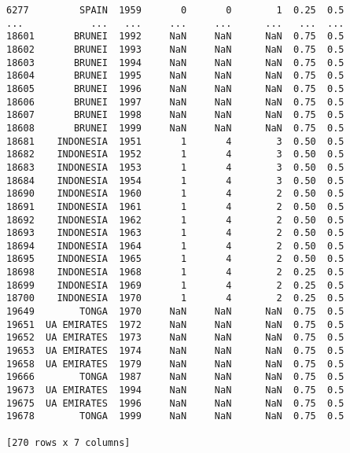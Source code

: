 \documentclass[12pt,fleqn]{article}\usepackage{common}
\begin{document}
\begin{verbatim}
6277         SPAIN  1959       0       0        1  0.25  0.5
...            ...   ...     ...     ...      ...   ...  ...
18601       BRUNEI  1992     NaN     NaN      NaN  0.75  0.5
18602       BRUNEI  1993     NaN     NaN      NaN  0.75  0.5
18603       BRUNEI  1994     NaN     NaN      NaN  0.75  0.5
18604       BRUNEI  1995     NaN     NaN      NaN  0.75  0.5
18605       BRUNEI  1996     NaN     NaN      NaN  0.75  0.5
18606       BRUNEI  1997     NaN     NaN      NaN  0.75  0.5
18607       BRUNEI  1998     NaN     NaN      NaN  0.75  0.5
18608       BRUNEI  1999     NaN     NaN      NaN  0.75  0.5
18681    INDONESIA  1951       1       4        3  0.50  0.5
18682    INDONESIA  1952       1       4        3  0.50  0.5
18683    INDONESIA  1953       1       4        3  0.50  0.5
18684    INDONESIA  1954       1       4        3  0.50  0.5
18690    INDONESIA  1960       1       4        2  0.50  0.5
18691    INDONESIA  1961       1       4        2  0.50  0.5
18692    INDONESIA  1962       1       4        2  0.50  0.5
18693    INDONESIA  1963       1       4        2  0.50  0.5
18694    INDONESIA  1964       1       4        2  0.50  0.5
18695    INDONESIA  1965       1       4        2  0.50  0.5
18698    INDONESIA  1968       1       4        2  0.25  0.5
18699    INDONESIA  1969       1       4        2  0.25  0.5
18700    INDONESIA  1970       1       4        2  0.25  0.5
19649        TONGA  1970     NaN     NaN      NaN  0.75  0.5
19651  UA EMIRATES  1972     NaN     NaN      NaN  0.75  0.5
19652  UA EMIRATES  1973     NaN     NaN      NaN  0.75  0.5
19653  UA EMIRATES  1974     NaN     NaN      NaN  0.75  0.5
19658  UA EMIRATES  1979     NaN     NaN      NaN  0.75  0.5
19666        TONGA  1987     NaN     NaN      NaN  0.75  0.5
19673  UA EMIRATES  1994     NaN     NaN      NaN  0.75  0.5
19675  UA EMIRATES  1996     NaN     NaN      NaN  0.75  0.5
19678        TONGA  1999     NaN     NaN      NaN  0.75  0.5

[270 rows x 7 columns]
\end{verbatim}
\end{document}
